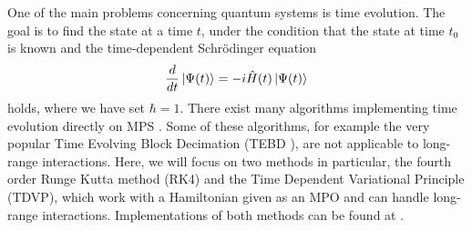 \def\textoffsetVertical{0.8}
\def\nodewidth{0.6cm}
\def\legwidth{0.8}
\def\nodedistance{1.5}
\def\textoffsetVerticalW{0.9}
\def\textoffsetHorizontalW{-0.9}
\def\textoffsetVerticalMPO{1.2}
\def\yoffset{1}
\def\xoffset{3}
\def\resultMPSYoffset{2.5}
\def\resultMPSXOffsetSmall{2}
\def\resultMPSXOffset{3}
\def\dotsOffset{3}
\def\conjOffsetVertical{1.5}
\def\conjOffsetVerticalLarge{2.2}
%
One of the main problems concerning quantum systems is time evolution. The goal is to find the
state at a time $t$, under the condition that the state at time $t_0$ is known and the time-dependent Schrödinger equation
\begin{equation*}
    \frac{d}{dt}\ket*{\Psi(t)} = -i\hat{H}(t)\ket*{\Psi(t)}
\end{equation*} 
holds, where we have set $\hbar = 1$. There exist many algorithms implementing time evolution directly on MPS \cite{Paeckel:2019}. 
Some of these algorithms, for example the very popular Time Evolving Block Decimation (TEBD \cite{Website:TEBD}), are not applicable to long-range interactions.
Here, we will focus on two methods in particular, the fourth order Runge Kutta method (RK4) and the Time Dependent Variational Principle (TDVP), which work with a Hamiltonian given as an MPO and can handle long-range interactions.
Implementations of both methods can be found at \cite{Sappler:2023}.

